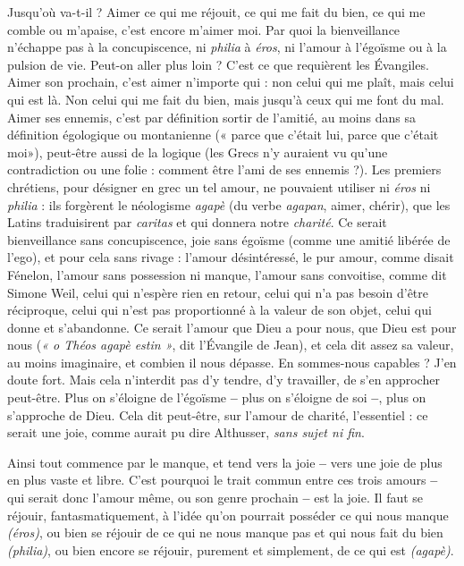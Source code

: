 Jusqu'où va-t-il ? Aimer ce qui me réjouit, ce qui me fait du bien, ce qui me
comble ou m’apaise, c’est encore m’aimer moi. Par quoi la bienveillance
n'échappe pas à la concupiscence, ni {\it philia} à {\it éros}, ni l'amour à l’égoïsme ou à
la pulsion de vie. Peut-on aller plus loin ? C'est ce que requièrent les Évangiles.
Aimer son prochain, c’est aimer n’importe qui : non celui qui me plaît, mais
celui qui est là. Non celui qui me fait du bien, mais jusqu’à ceux qui me font
du mal. Aimer ses ennemis, c’est par définition sortir de l’amitié, au moins
dans sa définition égologique ou montanienne (« parce que c'était lui, parce
que c'était moi»), peut-être aussi de la logique (les Grecs n’y auraient vu
qu’une contradiction ou une folie : comment être l’ami de ses ennemis ?). Les
premiers chrétiens, pour désigner en grec un tel amour, ne pouvaient utiliser ni
{\it éros} ni {\it philia} : ils forgèrent le néologisme {\it agapè} (du verbe {\it agapan}, aimer,
chérir), que les Latins traduisirent par {\it caritas} et qui donnera notre {\it charité}. Ce
serait bienveillance sans concupiscence, joie sans égoïsme (comme une amitié
libérée de l'ego), et pour cela sans rivage : l'amour désintéressé, le pur amour,
comme disait Fénelon, l'amour sans possession ni manque, l’amour sans
convoitise, comme dit Simone Weil, celui qui n’espère rien en retour, celui qui
n’a pas besoin d’être réciproque, celui qui n’est pas proportionné à la valeur de
son objet, celui qui donne et s’abandonne. Ce serait l'amour que Dieu a pour
nous, que Dieu est pour nous ({\it « o Théos agapè estin »}, dit l'Évangile de Jean), et
cela dit assez sa valeur, au moins imaginaire, et combien il nous dépasse. En
sommes-nous capables ? J'en doute fort. Mais cela n’interdit pas d’y tendre, d'y
travailler, de s’en approcher peut-être. Plus on s’éloigne de l’égoïsme {\bf --} plus on
s'éloigne de soi {\bf --}, plus on s’approche de Dieu. Cela dit peut-être, sur l’amour
de charité, l'essentiel : ce serait une joie, comme aurait pu dire Althusser, {\it sans
sujet ni fin}.

Ainsi tout commence par le manque, et tend vers la joie {\bf --} vers une joie de
plus en plus vaste et libre. C’est pourquoi le trait commun entre ces trois
amours {\bf --} qui serait donc l’amour même, ou son genre prochain {\bf --} est la joie. Il
faut se réjouir, fantasmatiquement, à l’idée qu’on pourrait posséder ce qui nous
manque {\it (éros)}, ou bien se réjouir de ce qui ne nous manque pas et qui nous fait
du bien {\it (philia)}, ou bien encore se réjouir, purement et simplement, de ce qui
est {\it (agapè)}.

